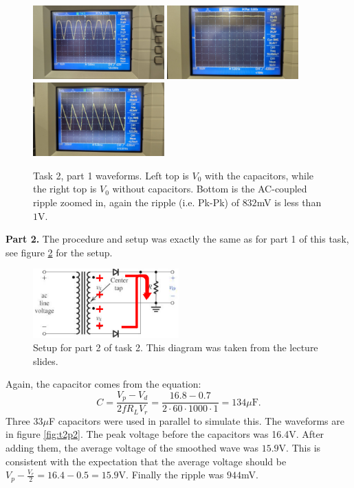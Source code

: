 \documentclass[letterpaper, reqno,11pt]{article}
\begin{document}
\begin{figure}[htpb]
        \centering
        \includegraphics[width=0.45\textwidth]{lab1/t2p1a}
        \includegraphics[width=0.45\textwidth]{lab1/t2p1b}
        \includegraphics[width=0.45\textwidth]{lab1/t2p1c}
        \caption{Task 2, part 1 waveforms. Left top is $V_0$ with the capacitors, while the right top is $V_0$ without capacitors. Bottom is the AC-coupled ripple zoomed in, again the ripple (i.e. Pk-Pk) of $832$mV is less than $1$V.}
        \label{fig:t2p1}
\end{figure}

{\medskip\noindent\bf Part 2.} The procedure and setup was exactly the same as for part 1 of this task, see figure \ref{fig:t2b} for the setup.

\begin{figure}[htpb]
        \centering
        \includegraphics[width=0.5\textwidth]{t2b}
        \caption{Setup for part 2 of task 2. This diagram was taken from the lecture slides.}
        \label{fig:t2b}
\end{figure}

Again, the capacitor comes from the equation:
\[
C = \frac{V_p-V_d}{2fR_LV_r}=\frac{16.8-0.7}{2\cdot 60\cdot 1000\cdot 1}=134\mu\text{F}
.\]
Three 33$\mu$F capacitors were used in parallel to simulate this. The waveforms are in figure \ref{fig:t2p2}. The peak voltage before the capacitors was 16.4V. After adding them, the average voltage of the smoothed wave was $15.9$V. This is consistent with the expectation that the average voltage should be $V_p- \frac{V_r}{2}=16.4-0.5=15.9$V. Finally the ripple was $944$mV.
\end{document}
